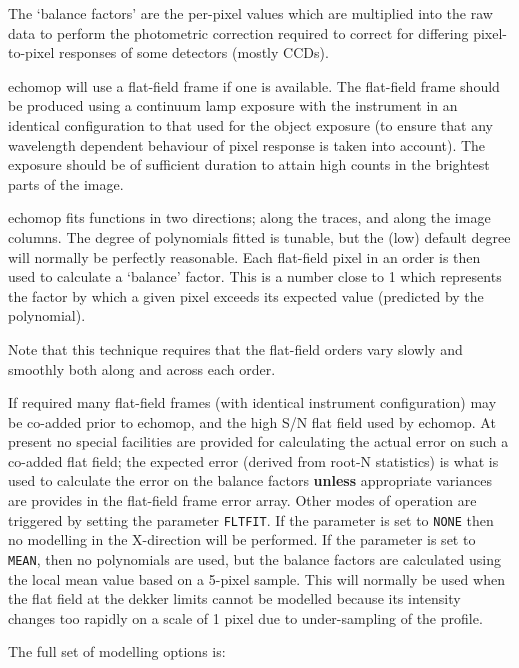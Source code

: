 \documentclass[twoside,11pt]{article}
\makeatletter
\newcommand{\htmlref}[2]{#1}
\renewcommand{\_}{\texttt{\symbol{95}}}
\newcommand{\cmdname}{\begingroup \catcode`\_=12 \realcmdname}
\newcommand{\realcmdname}[1]{\endgroup\texttt{#1}}
\newcommand{\myindex}[1]{\index{#1}}
\newcommand{\indexcmdname}[1]{\index{#1@\protect\cmdname{#1}}}
\newcommand{\cmdname}[1]{#1}
\newcommand{\myindex}[1]{}
\newcommand{\indexcmdname}[1]{}
\makeatother
\begin{document}
The `balance factors' are the per-pixel values which are multiplied into
the raw data to perform the photometric correction required to correct for
differing pixel-to-pixel responses of some detectors (mostly CCDs).

{\sc echomop} will use a flat-field frame if one is available. The flat-field
frame should  be produced using a continuum lamp exposure with the
instrument in an identical configuration to that used for the object
exposure (to ensure that any wavelength dependent behaviour of pixel
response is taken into account). The exposure should be of sufficient
duration to attain high counts in the brightest parts of the image.

{\sc echomop} fits functions in two directions; along the traces, and along the
image columns. The degree of polynomials fitted is tunable, but the
(low) default degree will normally be perfectly reasonable. Each flat-field
pixel in an order is then used to calculate a `balance' factor. This is a
number close to 1 which represents the factor by which a given pixel
exceeds its expected value (predicted by the polynomial).

Note that this technique requires that the flat-field orders vary slowly
and smoothly both along and across each order.

If required many flat-field frames (with identical instrument
configuration) may be co-added prior to {\sc echomop,} and the high S/N flat field
used by {\sc echomop.} At present no special facilities are provided for
calculating the actual error on such a co-added flat field; the expected
error (derived from root-N statistics) is what is used to calculate the
error on the balance factors {\bf unless} appropriate
variances are provides in the flat-field frame error array.
\myindex{Errors!on flat field}
\indexcmdname{FLTFIT}
Other modes of operation are triggered by setting the parameter
\htmlref{\texttt{FLTFIT}}{par_FLTFIT}\@.
If the parameter is set to \texttt{NONE} then no modelling in
the X-direction will be performed. If the parameter is set to \texttt{MEAN},
then no polynomials are  used, but the balance factors are calculated
using the local mean value based  on a 5-pixel sample. This will normally
be used when the flat field at the dekker limits cannot be modelled because
its intensity changes too rapidly on a scale of 1 pixel due to
under-sampling of the profile.

The full set of modelling options is:
\end{document}
